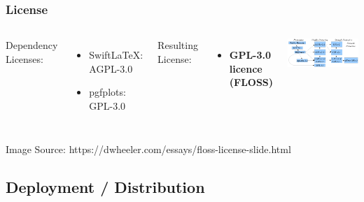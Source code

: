 \begin{frame}
    \frametitle{License}
    \begin{columns}
        Dependency Licenses:
        \begin{itemize}
            \large
            \item SwiftLaTeX: AGPL-3.0
            \item pgfplots: GPL-3.0
        \end{itemize}
        \hfill \break
        Resulting License:
        \begin{itemize}
            \large
            \item \textbf{GPL-3.0 licence (FLOSS)}
        \end{itemize}
        \includegraphics[width=1\linewidth]{../assets/floss-licenses.png}
    \end{columns}
    \hfill \break
    \hfill \break
    \hfill \break
    \hfill \break
    \hfill \break
    \hfill \break
    \small
    Image Source: https://dwheeler.com/essays/floss-license-slide.html
\end{frame}

\subsection{Deployment / Distribution}\label{subsec:deployment-and-distribution}

